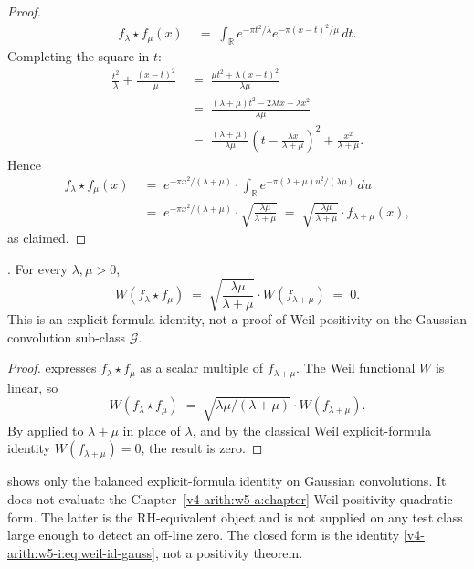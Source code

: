 \begin{proof}
\begin{align*}
f_{\lambda}\star f_{\mu}(x)
&\;=\;\int_{\mathbb{R}}e^{-\pi t^{2}/\lambda}e^{-\pi(x-t)^{2}/\mu}\,dt.
\end{align*}
Completing the square in \(t\):
\begin{align*}
\frac{t^{2}}{\lambda}+\frac{(x-t)^{2}}{\mu}
&\;=\;\frac{\mu t^{2}+\lambda(x-t)^{2}}{\lambda\mu}\\
&\;=\;\frac{(\lambda+\mu)t^{2}-2\lambda t x+\lambda x^{2}}{\lambda\mu}\\
&\;=\;\frac{(\lambda+\mu)}{\lambda\mu}\!\left(t-\frac{\lambda x}{\lambda+\mu}\right)^{2}+\frac{x^{2}}{\lambda+\mu}.
\end{align*}
Hence
\begin{align*}
f_{\lambda}\star f_{\mu}(x)
&\;=\;e^{-\pi x^{2}/(\lambda+\mu)}\cdot\int_{\mathbb{R}}e^{-\pi(\lambda+\mu)u^{2}/(\lambda\mu)}\,du\\
&\;=\;e^{-\pi x^{2}/(\lambda+\mu)}\cdot\sqrt{\frac{\lambda\mu}{\lambda+\mu}}
\;=\;\sqrt{\frac{\lambda\mu}{\lambda+\mu}}\cdot f_{\lambda+\mu}(x),
\end{align*}
as claimed.
\end{proof}

\begin{proposition}
\label{v4-arith:w5-i:prop:gauss-pos}
\ClaimStatusProvedHere. For every \(\lambda,\mu>0\),
\begin{equation}
\label{v4-arith:w5-i:eq:gauss-pos}
W(f_{\lambda}\star f_{\mu})\;=\;\sqrt{\frac{\lambda\mu}{\lambda+\mu}}\cdot W(f_{\lambda+\mu})\;=\;0.
\end{equation}
This is an explicit-formula identity, not a proof of Weil positivity on
the Gaussian convolution sub-class \(\mathcal{G}\).
\end{proposition}

\begin{proof}
 expresses
\(f_{\lambda}\star f_{\mu}\) as a scalar multiple of
\(f_{\lambda+\mu}\). The Weil functional \(W\) is linear, so
\[
W(f_{\lambda}\star f_{\mu})\;=\;\sqrt{\lambda\mu/(\lambda+\mu)}\cdot W(f_{\lambda+\mu}).
\]
By  applied to
\(\lambda+\mu\) in place of \(\lambda\), and by the classical Weil
explicit-formula identity \(W(f_{\lambda+\mu})=0\), the result is zero.
\end{proof}

\begin{remark}
\label{v4-arith:w5-i:rem:gauss-pos-domain}
 shows only the balanced
explicit-formula identity on Gaussian convolutions. It does not evaluate
the Chapter~\ref{v4-arith:w5-a:chapter} Weil positivity quadratic form.
The latter is the RH-equivalent object and is not supplied on any test
class large enough to detect an off-line zero. The closed form is the
identity
\eqref{v4-arith:w5-i:eq:weil-id-gauss}, not a positivity theorem.
\end{remark}

